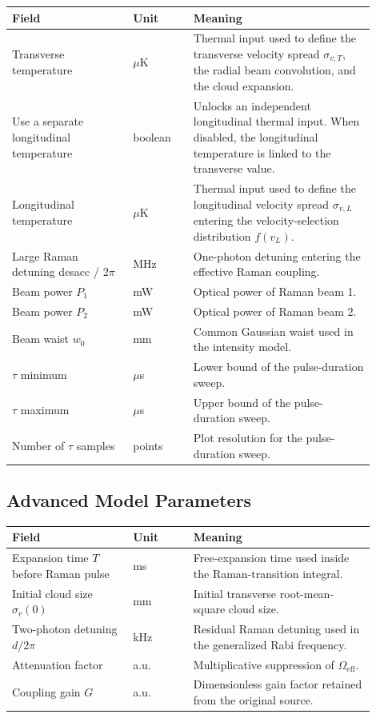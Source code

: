 \documentclass[11pt,a4paper]{article}
\begin{document}
\begin{longtable}{>{\raggedright\arraybackslash}p{0.30\linewidth} >{\raggedright\arraybackslash}p{0.15\linewidth} >{\raggedright\arraybackslash}p{0.45\linewidth}}
\toprule
Field & Unit & Meaning \\
\midrule
Transverse temperature & $\mu$K & Thermal input used to define the transverse velocity spread $\sigma_{v,T}$, the radial beam convolution, and the cloud expansion. \\
Use a separate longitudinal temperature & boolean & Unlocks an independent longitudinal thermal input. When disabled, the longitudinal temperature is linked to the transverse value. \\
Longitudinal temperature & $\mu$K & Thermal input used to define the longitudinal velocity spread $\sigma_{v,L}$ entering the velocity-selection distribution $f(v_L)$. \\
Large Raman detuning desacc / $2\pi$ & MHz & One-photon detuning entering the effective Raman coupling. \\
Beam power $P_1$ & mW & Optical power of Raman beam 1. \\
Beam power $P_2$ & mW & Optical power of Raman beam 2. \\
Beam waist $w_0$ & mm & Common Gaussian waist used in the intensity model. \\
$\tau$ minimum & $\mu$s & Lower bound of the pulse-duration sweep. \\
$\tau$ maximum & $\mu$s & Upper bound of the pulse-duration sweep. \\
Number of $\tau$ samples & points & Plot resolution for the pulse-duration sweep. \\
\bottomrule
\end{longtable}

\subsection{Advanced Model Parameters}

\begin{longtable}{>{\raggedright\arraybackslash}p{0.30\linewidth} >{\raggedright\arraybackslash}p{0.15\linewidth} >{\raggedright\arraybackslash}p{0.45\linewidth}}
\toprule
Field & Unit & Meaning \\
\midrule
Expansion time $T$ before Raman pulse & ms & Free-expansion time used inside the Raman-transition integral. \\
Initial cloud size $\sigma_r(0)$ & mm & Initial transverse root-mean-square cloud size. \\
Two-photon detuning $d / 2\pi$ & kHz & Residual Raman detuning used in the generalized Rabi frequency. \\
Attenuation factor & a.u. & Multiplicative suppression of $\Omega_{\mathrm{eff}}$. \\
Coupling gain $G$ & a.u. & Dimensionless gain factor retained from the original source. \\
\bottomrule
\end{longtable}
\end{document}
